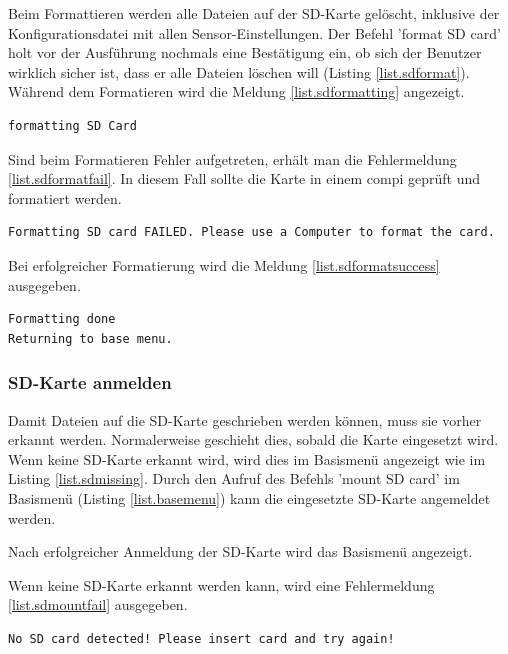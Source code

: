Beim Formattieren werden alle Dateien auf der SD-Karte gelöscht, inklusive der Konfigurationsdatei mit allen Sensor-Einstellungen. Der Befehl 'format SD card' holt vor der Ausführung nochmals eine Bestätigung ein, ob sich der Benutzer wirklich sicher ist, dass er alle Dateien löschen will (Listing \ref{list.sdformat}). Während dem Formatieren wird die Meldung \ref{list.sdformatting} angezeigt.

\begin{lstlisting}[caption=Statusmeldung SD formatieren, label=list.sdformatting]
formatting SD Card
\end{lstlisting}

Sind beim Formatieren Fehler aufgetreten, erhält man die Fehlermeldung \ref{list.sdformatfail}. In diesem Fall sollte die Karte in einem \gls{compi} geprüft und formatiert werden.

\begin{lstlisting}[caption=Fehlermeldung SD formatieren, label=list.sdformatfail]
Formatting SD card FAILED. Please use a Computer to format the card.
\end{lstlisting}

Bei erfolgreicher Formatierung wird die Meldung \ref{list.sdformatsuccess} ausgegeben. 

\begin{lstlisting}[caption=Erfolgsmeldung SD formatieren, label=list.sdformatsuccess]
Formatting done
Returning to base menu.
\end{lstlisting}


\subsubsection{SD-Karte anmelden}\label{sssec.sdmount}
Damit Dateien auf die SD-Karte geschrieben werden können, muss sie vorher erkannt werden. Normalerweise geschieht dies, sobald die Karte eingesetzt wird. Wenn keine SD-Karte erkannt wird, wird dies im Basismenü angezeigt wie im Listing \ref{list.sdmissing}. Durch den Aufruf des Befehls 'mount SD card' im Basismenü (Listing \ref{list.basemenu}) kann die eingesetzte SD-Karte angemeldet werden.

Nach erfolgreicher Anmeldung der SD-Karte wird das Basismenü angezeigt. 

Wenn keine SD-Karte erkannt werden kann, wird eine Fehlermeldung \ref{list.sdmountfail} ausgegeben.

\begin{lstlisting}[caption=Fehlermeldung SD-Karte anmelden, label=list.sdmountfail]
No SD card detected! Please insert card and try again!
\end{lstlisting}


